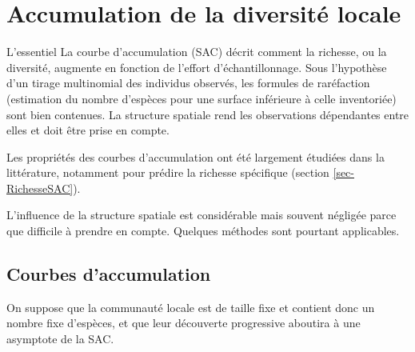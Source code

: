 \documentclass[
  11pt,
  french,
  a4paper,
  extrafontsizes,onecolumn,openright
  ]{memoir}
\newenvironment{Summary}
  {\begin{bclogo}[logo=\bctrombone, noborder=true, couleur=lightgray!50]{L'essentiel}\parindent0pt}
  {\end{bclogo}}
\newlength{\rf}
\begin{document}
\normalsize

\chapter{Accumulation de la diversité locale}\label{chap-Accumulation}

\begin{Summary}
La courbe d'accumulation (SAC) décrit comment la richesse, ou la diversité, augmente en fonction de l'effort d'échantillonnage.
Sous l'hypothèse d'un tirage multinomial des individus observés, les formules de raréfaction (estimation du nombre d'espèces pour une surface inférieure à celle inventoriée) sont bien contenues.
La structure spatiale rend les observations dépendantes entre elles et doit être prise en compte.

\end{Summary}

Les propriétés des courbes d'accumulation ont été largement étudiées dans la littérature, notamment pour prédire la richesse spécifique (section \ref{sec-RichesseSAC}).

L'influence de la structure spatiale est considérable mais souvent négligée parce que difficile à prendre en compte.
Quelques méthodes sont pourtant applicables.

\section{Courbes d'accumulation}\label{sec-SAC}

On suppose que la communauté locale est de taille fixe et contient donc un nombre fixe d'espèces, et que leur découverte progressive aboutira à une asymptote de la SAC.



\scriptsize
\end{document}
